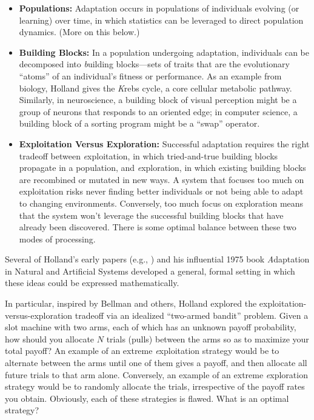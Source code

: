 \documentclass{sig-alternate}
\begin{document}
\begin{itemize}
\item {\bf Populations:} Adaptation occurs in populations of
  individuals evolving (or learning) over time, in which statistics 
  can be leveraged to direct population dynamics.  (More on this below.)  

\item {\bf Building Blocks:} In a population undergoing adaptation,
  individuals can be decomposed into {\emph building blocks}---sets of
  traits that are the evolutionary ``atoms'' of an individual's
  fitness or performance. As an example from biology, Holland gives
  the {\emph Krebs cycle}, a core cellular metabolic
  pathway. Similarly, in neuroscience, a building block of visual
  perception might be a group of neurons that responds to an oriented
  edge; in computer science, a building block of a sorting program
  might be a ``swap'' operator.

\item {\bf Exploitation Versus Exploration:} Successful adaptation
  requires the right tradeoff between {\emph exploitation}, in which
  tried-and-true building blocks propagate in a population, and {\emph
    exploration}, in which existing building blocks are recombined or
  mutated in new ways.  A system that focuses too much on exploitation
  risks never finding better individuals or not being able to adapt to
  changing environments.  Conversely, too much focus on exploration
  means that the system won't leverage the successful building blocks
  that have already been discovered.  There is some optimal balance
  between these two modes of processing.
\end{itemize}

Several of Holland's early papers (e.g.,
\cite{Holland1962,Holland1973}) and his influential
1975 book {\emph Adaptation in Natural and Artificial Systems}
\cite{Holland1975} developed a general, formal setting in which these ideas
could be expressed mathematically.

In particular, inspired by Bellman \cite{Bellman1961} and
others, Holland explored the exploitation-versus-exploration tradeoff
via an idealized ``two-armed bandit'' problem.  Given a slot machine
with two arms, each of which has an unknown payoff probability, how
should you allocate $N$ trials (pulls) between the arms so as to
maximize your total payoff?  An example of an extreme {\emph
  exploitation} strategy would be to alternate between the arms until
one of them gives a payoff, and then allocate all future trials to
that arm alone.  Conversely, an example of an extreme {\emph
  exploration} strategy would be to randomly allocate the trials,
irrespective of the payoff rates you obtain.  Obviously, each of these
strategies is flawed.  What is an optimal strategy?
\end{document}
